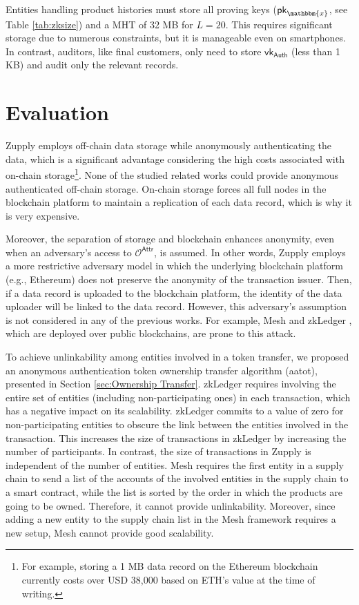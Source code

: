 Entities handling product histories must store all proving keys ($\mathsf{pk}_\mathbbm{x}$, see Table \ref{tab:zksize}) and a \textsf{MHT} of 32 MB for $L=20$. This requires significant storage due to numerous constraints, but it is manageable even on smartphones. In contrast, auditors, like final customers, only need to store $\mathsf{vk}_\mathsf{Auth}$ (less than 1 KB) and audit only the relevant records.

\section{Evaluation}
Zupply employs off-chain data storage while anonymously authenticating the data, which is a significant advantage considering the high costs associated with on-chain storage\footnote{For example, storing a 1 MB data record on the Ethereum blockchain currently costs over USD 38,000 based on ETH’s value at the time of writing.}. None of the studied related works could provide anonymous authenticated off-chain storage. On-chain storage forces all full nodes in the blockchain platform to maintain a replication of each data record, which is why it is very expensive.

Moreover, the separation of storage and blockchain enhances anonymity, even when an adversary's access to $\mathcal{O}^\mathsf{Attr}$, is assumed. In other words, Zupply employs a more restrictive adversary model in which the underlying blockchain platform (e.g., Ethereum) does not preserve the anonymity of the transaction issuer. Then, if a data record is uploaded to the blockchain platform, the identity of the data uploader will be linked to the data record. However, this adversary's assumption is not considered in any of the previous works. For example, Mesh \cite{altawy2019mesh} and zkLedger \cite{zkLedger2018}, which are deployed over public blockchains, are prone to this attack.


To achieve unlinkability among entities involved in a token transfer, we proposed an anonymous authentication token ownership transfer algorithm (\gls{aatot}), presented in Section \ref{sec:Ownership Transfer}. zkLedger requires involving the entire set of entities (including non-participating ones) in each transaction, which has a negative impact on its scalability. zkLedger commits to a value of zero for non-participating entities to obscure the link between the entities involved in the transaction. This increases the size of transactions in zkLedger by increasing the number of participants.  In contrast, the size of transactions in Zupply is independent of the number of entities. Mesh requires the first entity in a supply chain to send a list of the accounts of the involved entities in the supply chain to a smart contract, while the list is sorted by the order in which the products are going to be owned. Therefore, it cannot  provide unlinkability. Moreover, since adding a new entity to the supply chain list in the Mesh framework requires a new setup, Mesh cannot provide good scalability.

